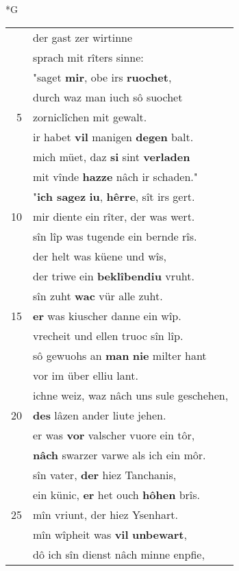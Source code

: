 \documentclass[8pt,a4paper,notitlepage]{article}
\begin{document}
\newpage
\begin{table}[ht]
\begin{minipage}[t]{0.5\linewidth}
\small
\begin{center}*G
\end{center}
\begin{tabular}{rl}
 & der gast zer wirtinne\\ 
 & sprach mit rîters sinne:\\ 
 & "saget \textbf{mir}, obe irs \textbf{ruochet},\\ 
 & durch waz man iuch sô suochet\\ 
5 & zorniclîchen mit gewalt.\\ 
 & ir habet \textbf{vil} manigen \textbf{degen} balt.\\ 
 & mich müet, daz \textbf{si} sint \textbf{verladen}\\ 
 & mit vînde \textbf{hazze} nâch ir schaden."\\ 
 & "\textbf{ich sagez} \textbf{iu}, \textbf{hêrre}, sît irs gert.\\ 
10 & mir diente ein rîter, der was wert.\\ 
 & sîn lîp was tugende ein bernde rîs.\\ 
 & der helt was küene und wîs,\\ 
 & der triwe ein \textbf{beklîbendiu} vruht.\\ 
 & sîn zuht \textbf{wac} vür alle zuht.\\ 
15 & \textbf{er} was kiuscher danne ein wîp.\\ 
 & vrecheit und ellen truoc sîn lîp.\\ 
 & sô gewuohs an \textbf{man} \textbf{nie} milter hant\\ 
 & vor im über elliu lant.\\ 
 & ichne weiz, waz nâch uns sule geschehen,\\ 
20 & \textbf{des} lâzen ander liute jehen.\\ 
 & er was \textbf{vor} valscher vuore ein tôr,\\ 
 & \textbf{nâch} swarzer varwe als ich ein môr.\\ 
 & sîn vater, \textbf{der} hiez Tanchanis,\\ 
 & ein künic, \textbf{er} het ouch \textbf{hôhen} brîs.\\ 
25 & mîn vriunt, der hiez Ysenhart.\\ 
 & mîn wîpheit was \textbf{vil} \textbf{unbewart},\\ 
 & dô ich sîn dienst nâch minne enpfie,\\ 

\end{tabular}
\end{minipage}
\end{table}
\end{document}
